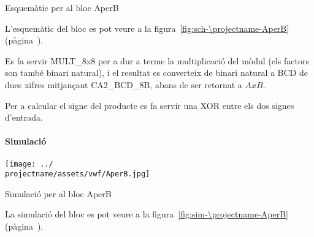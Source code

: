 
\begin{contendfig}
  \begin{center}
  \end{center}
  \caption{\label{fig:sch-\projectname-AperB} Esquemàtic per al bloc \textsf{AperB}}
\end{contendfig}

L'esquemàtic del bloc es pot veure a la figura~\ref{fig:sch-\projectname-AperB} (pàgina~\pageref{fig:sch-\projectname-AperB}).

Es fa servir \textsf{MULT\_8x8} per a dur a terme la multiplicació del mòdul
(els factors son també binari natural), i el resultat es converteix
de binari natural a BCD de dues xifres mitjançant \textsf{CA2\_BCD\_8B},
abans de ser retornat a $AxB$.

Per a calcular el signe del producte es fa servir una \textsf{XOR} entre els
dos signes d'entrada.

\paragraph{Simulació}

\begin{contendfig}
  \begin{center}
    \texttt{[image: ../\\projectname/assets/vwf/AperB.jpg]}
  \end{center}
  \caption{\label{fig:sim-\projectname-AperB} Simulació per al bloc \textsf{AperB}}
\end{contendfig}

La simulació del bloc es pot veure a la figura~\ref{fig:sim-\projectname-AperB} (pàgina~\pageref{fig:sim-\projectname-AperB}).


\vspace{1cm}
